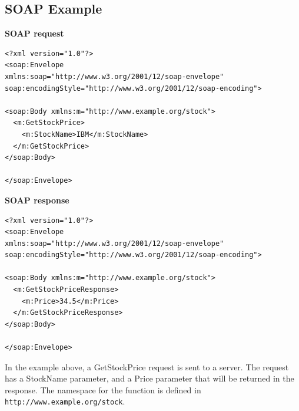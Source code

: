 \documentclass[12pt]{article}
\begin{document}
\subsection{SOAP Example}
\label{sec:soapeexample}
\textbf{SOAP request}\\
\begin{lstlisting}
<?xml version="1.0"?>
<soap:Envelope
xmlns:soap="http://www.w3.org/2001/12/soap-envelope"
soap:encodingStyle="http://www.w3.org/2001/12/soap-encoding">

<soap:Body xmlns:m="http://www.example.org/stock">
  <m:GetStockPrice>
    <m:StockName>IBM</m:StockName>
  </m:GetStockPrice>
</soap:Body>

</soap:Envelope>
\end{lstlisting}
\textbf{SOAP response}
\begin{lstlisting}
<?xml version="1.0"?>
<soap:Envelope
xmlns:soap="http://www.w3.org/2001/12/soap-envelope"
soap:encodingStyle="http://www.w3.org/2001/12/soap-encoding">

<soap:Body xmlns:m="http://www.example.org/stock">
  <m:GetStockPriceResponse>
    <m:Price>34.5</m:Price>
  </m:GetStockPriceResponse>
</soap:Body>

</soap:Envelope>
\end{lstlisting}
In the example above, a GetStockPrice request is sent to a server. The request has a StockName parameter, and a Price parameter that will be returned in the response. The namespace for the function is defined in \texttt{http://www.example.org/stock}.\cite{soap}\\
\newpage
\end{document}
